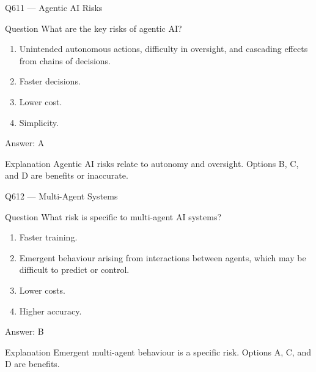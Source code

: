 \documentclass[aspectratio=169,8pt]{beamer}
\begin{document}
	\begin{frame}{Q611 --- Agentic AI Risks}
		\begin{block}{Question}
			What are the key risks of agentic AI?
			\begin{enumerate}
				\item Unintended autonomous actions, difficulty in oversight, and cascading effects from chains of decisions.
				\item Faster decisions.
				\item Lower cost.
				\item Simplicity.
			\end{enumerate}
		\end{block}
		\begin{exampleblock}{Answer: A}\end{exampleblock}
		\begin{block}{Explanation}
			Agentic AI risks relate to autonomy and oversight. Options B, C, and D are benefits or inaccurate.
		\end{block}
	\end{frame}
	
	\begin{frame}{Q612 --- Multi-Agent Systems}
		\begin{block}{Question}
			What risk is specific to multi-agent AI systems?
			\begin{enumerate}
				\item Faster training.
				\item Emergent behaviour arising from interactions between agents, which may be difficult to predict or control.
				\item Lower costs.
				\item Higher accuracy.
			\end{enumerate}
		\end{block}
		\begin{exampleblock}{Answer: B}\end{exampleblock}
		\begin{block}{Explanation}
			Emergent multi-agent behaviour is a specific risk. Options A, C, and D are benefits.
		\end{block}
	\end{frame}
	
\end{document}
